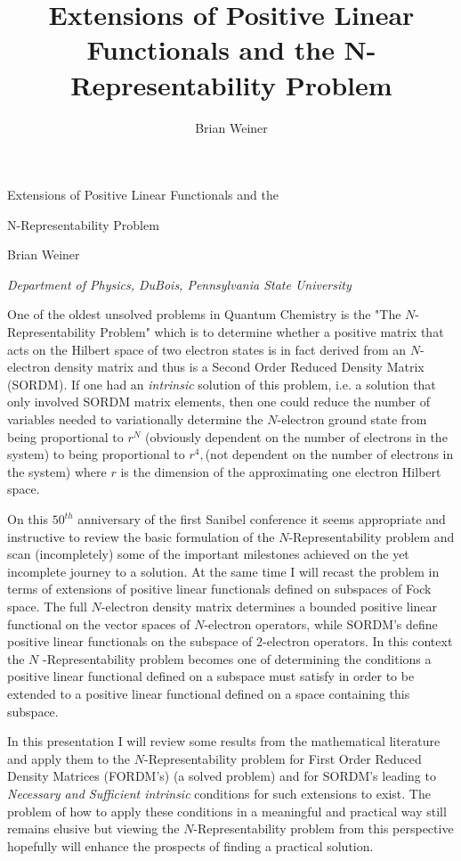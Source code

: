 \documentclass[aps,preprint]{revtex4}%
\begin{document}
\preprint{ }
\title[Positive Functionals]{Extensions of Positive Linear Functionals and the N-Representability Problem }
\author{Brian Weiner}
\maketitle


\begin{center}


{\large Extensions of Positive Linear Functionals and the }

{\large N-Representability Problem }

{\large Brian Weiner}

\textsl{Department of Physics, DuBois, Pennsylvania State University}

\bigskip


\end{center}

One of the oldest unsolved problems in Quantum Chemistry is the "The
$N$-Representability Problem" which is to determine whether a positive matrix
that acts on the Hilbert space of two electron states is in fact derived from
an $N$-electron density matrix and thus is a Second Order Reduced Density
Matrix (SORDM). If one had an \emph{intrinsic} solution of this problem, i.e.
a solution that only involved SORDM matrix elements, then one could reduce the
number of variables needed to variationally determine the $N$-electron ground
state from being proportional to $r^{N}$ (obviously dependent on the number of
electrons in the system) to being proportional to $r^{4},$(not dependent on
the number of electrons in the system) where $r$ is the dimension of the
approximating one electron Hilbert space.

On this $50^{th}$ anniversary of the first Sanibel conference it seems
appropriate and instructive to review the basic formulation of the
$N$-Representability problem and scan (incompletely) some of the important
milestones achieved on the yet incomplete journey to a solution. At the same
time I will recast the problem in terms of extensions of positive linear
functionals defined on subspaces of Fock space. The full $N$-electron density
matrix determines a bounded positive linear functional on the vector spaces of
$N$-electron operators, while SORDM's define positive linear functionals on
the subspace of $2$-electron operators. In this context the $N$%
-Representability problem becomes one of determining the conditions a positive
linear functional defined on a subspace must satisfy in order to be extended
to a positive linear functional defined on a space containing this subspace.

In this presentation I will review some results from the mathematical
literature and apply them to the $N$-Representability problem for First Order
Reduced Density Matrices (FORDM's) (a solved problem) and for SORDM's leading
to \emph{Necessary and Sufficient intrinsic }conditions for such extensions to
exist. The problem of how to apply these conditions in a meaningful and
practical way still remains elusive but viewing the $N$-Representability
problem from this perspective hopefully will enhance the prospects of finding
a practical solution.
\end{document}
